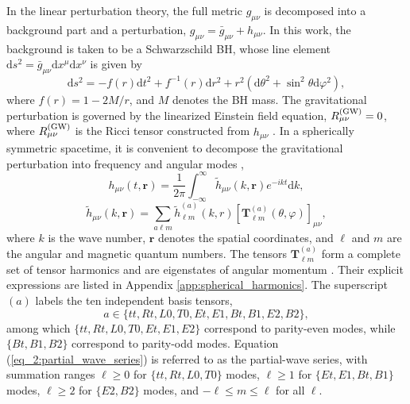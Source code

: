 \documentclass[reprint,amsmath,amssymb,aps,prd]{revtex4-2}
\newcommand{\dd}[0]{\mathrm{d}}
\begin{document}
In the linear perturbation theory, the full metric $g_{\mu\nu}$ is decomposed into a background part and a perturbation, $g_{\mu\nu}=\bar{g}_{\mu\nu}+h_{\mu\nu}$.
In this work, the background is taken to be a Schwarzschild BH, whose line element $\dd{s}^2=\bar{g}_{\mu\nu}\dd{x}^{\mu}\dd{x}^{\nu}$ is given by \cite{Weinberg}
\begin{equation}
\dd{s}^2=-f(r)\dd{t}^2+f^{-1}(r)\dd{r}^2+r^2(\dd{\theta}^2+\sin^2\theta\dd{\varphi}^2),
\end{equation}
where $f(r)=1-2M/r$, and $M$ denotes the BH mass.
The gravitational perturbation is governed by the linearized Einstein field equation, $R^{\rm(GW)}_{\mu\nu}=0$, where $R^{\rm(GW)}_{\mu\nu}$ is the Ricci tensor constructed from $h_{\mu\nu}$ \cite{MTW}. 
In a spherically symmetric spacetime, it is convenient to decompose the gravitational perturbation into frequency and angular modes \cite{Maggiore_2018_b},
\begin{equation}
\label{eq_2:Fourier}
h_{\mu\nu}(t,\bm{r})
=\frac{1}{2\pi}\int_{-\infty}^{\infty}\tilde{h}_{\mu\nu}(k,\bm{r})e^{-ikt}\dd k,
\end{equation}
\begin{equation}
\label{eq_2:partial_wave_series}
\tilde{h}_{\mu\nu}(k,\bm{r})
=\sum_{a\ell m}
\tilde{h}^{(a)}_{\ell m}(k,r)
\left[\mathbf{T}_{\ell m}^{(a)}(\theta,\varphi)\right]_{\mu\nu},
\end{equation}
where $k$ is the wave number, $\bm{r}$ denotes the spatial coordinates, and $\ell$ and $m$ are the angular and magnetic quantum numbers.
The tensors $\mathbf{T}_{\ell m}^{(a)}$ form a complete set of tensor harmonics and are eigenstates of angular momentum \cite{Maggiore_2018_a}. Their explicit expressions are listed in Appendix \ref{app:spherical_harmonics}. The superscript $(a)$ labels the ten independent basis tensors,
\begin{equation}
a\in\{tt,Rt,L0,T0,Et,E1,Bt,B1,E2,B2\},
\end{equation}
among which $\{tt, Rt, L0, T0, Et, E1, E2\}$ correspond to parity-even modes, while $\{Bt, B1, B2\}$ correspond to parity-odd modes.
Equation (\ref{eq_2:partial_wave_series}) is referred to as the partial-wave series, with summation ranges $\ell\geqslant0$ for $\{tt, Rt, L0, T0\}$ modes, $\ell\geqslant1$ for $\{Et, E1, Bt, B1\}$ modes, $\ell\geqslant2$ for $\{E2, B2\}$ modes, and $-\ell\leqslant m\leqslant\ell$ for all $\ell$.
\end{document}
